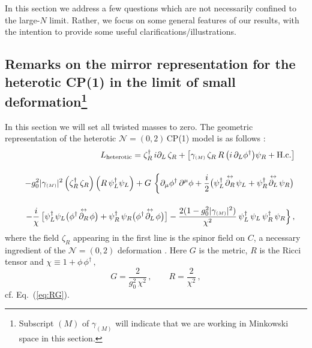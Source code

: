\documentclass[epsfig,12pt]{article}
\def\beq{\begin{equation}}
\def\eeq{\end{equation}}
\def\beqn{\begin{eqnarray}}
\def\eeqn{\end{eqnarray}}
\newcommand{\nzt}{${\mathcal N}=(0,2)\,$}
\def\beqn{\begin{eqnarray}}
\def\eeqn{\end{eqnarray}}
\def\beq{\begin{equation}}
\def\eeq{\end{equation}}
\newcommand{\ssm}{{\scriptscriptstyle(M)}}
\begin{document}
{In this section we  address a few questions which are not necessarily confined to the large-$N$ limit.
Rather, we focus on some general features of our results, with the intention to provide
some useful clarifications/illustrations.

\subsection[Remarks on the mirror representation
for the heterotic CP(1) in the limit of small deformation]
{Remarks on the mirror representation
for the heterotic CP(1) in the limit of small deformation\footnote{Subscript 
$\ssm$ of $\gamma_\ssm$ will indicate that we are working in Minkowski space in this section.}}

In this section we will set all twisted masses to zero.
The geometric representation of  the heterotic \nzt CP(1) model is as follows \cite{SY1}:
\beqn
&&
L_{{\rm heterotic}}= 
\zeta_R^\dagger \, i\partial_L \, \zeta_R  + 
\left[\gamma_\ssm \, \zeta_R  \,R\,  \big( i\,\partial_{L}\phi^{\dagger} \big)\psi_R
+{\rm H.c.}\right] \\[4mm]
&&
-g_0^2|\gamma_\ssm |^2 \left(\zeta_R^\dagger\, \zeta_R
\right)\left(R\,  \psi_L^\dagger\psi_L\right)
\nonumber
+
G\, \left\{\rule{0mm}{5mm}
\partial_\mu \phi^\dagger\, \partial^\mu\phi  
+\frac{i}{2}\big(\psi_L^\dagger\!\stackrel{\leftrightarrow}{\partial_R}\!\psi_L 
+ \psi_R^\dagger\!\stackrel{\leftrightarrow}{\partial_L}\!\psi_R
\big)\right.
\nonumber
\\[4mm] 
&&
-\frac{i}{\chi}\,  \big[\psi_L^\dagger \psi_L
\big(\phi^\dagger \!\stackrel{\leftrightarrow}{\partial_R}\!\phi
\big)+ \psi_R^\dagger\, \psi_R
\big(\phi^\dagger\!\stackrel{\leftrightarrow}{\partial_L}\!\phi
\big)
\big]
-
\frac{2(1- g_0^2 |\gamma_\ssm |^2)}{\chi^2}\,\psi_L^\dagger\,\psi_L \,\psi_R^\dagger\,\psi_R
\Big\}\,,
\label{AAone}
\eeqn
where the field $\zeta_R$ appearing in the first line is
the spinor field on $C$, a  necessary ingredient  of the ${\mathcal N}=(0,2)$ deformation
\cite{EdTo}.
Here $G$ is the metric, $R$ is the Ricci tensor and $\chi \equiv 1+\phi\,\phi^\dagger\,,$
\beq
G=
\frac{2}{g_{0}^2\,\chi^{2}}\,,\qquad R =\frac{2}{\chi^2}\,,
\label{fsmetrone}
\eeq
cf. Eq.~(\ref{eq:RG}).

}
\end{document}
